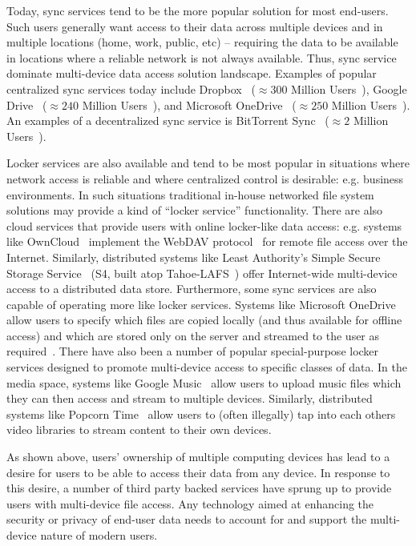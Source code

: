 Today, sync services tend to be the more popular solution for most
end-users. Such users generally want access to their data across
multiple devices and in multiple locations (home, work, public,
etc) -- requiring the data to be available in locations where a
reliable network is not always available. Thus, sync service dominate
multi-device data access solution landscape. Examples of popular
centralized sync services today include Dropbox~\cite{dropbox}
($\approx300$ Million Users~\cite{smith-stats}), Google
Drive~\cite{google-drive} ($\approx240$ Million
Users~\cite{smith-stats}), and Microsoft
OneDrive~\cite{microsoft-onedrive} ($\approx250$ Million
Users~\cite{smith-stats}).  An examples of a decentralized sync
service is BitTorrent Sync~\cite{bittorrent-sync} ($\approx2$ Million
Users~\cite{smith-stats}).

Locker services are also available and tend to be most popular in
situations where network access is reliable and where centralized
control is desirable: e.g. business environments. In such situations
traditional in-house networked file system solutions may provide a
kind of ``locker service'' functionality. There are also cloud
services that provide users with online locker-like data access:
e.g. systems like OwnCloud~\cite{owncloud} implement the WebDAV
protocol~\cite{goland1999} for remote file access over the
Internet. Similarly, distributed systems like Least Authority's Simple
Secure Storage Service~\cite{leastauthority-s4} (S4, built atop
Tahoe-LAFS~\cite{wilcox-o'hearn2008}) offer Internet-wide multi-device
access to a distributed data store. Furthermore, some sync services
are also capable of operating more like locker services. Systems like
Microsoft OneDrive allow users to specify which files are copied
locally (and thus available for offline access) and which are stored
only on the server and streamed to the user as
required~\cite{microsoft-onedrive-online}. There have also been a
number of popular special-purpose locker services designed to promote
multi-device access to specific classes of data. In the media space,
systems like Google Music~\cite{google-music} allow users to upload
music files which they can then access and stream to multiple
devices. Similarly, distributed systems like Popcorn
Time~\cite{popcorntime} allow users to (often illegally) tap into each
others video libraries to stream content to their own devices.

As shown above, users' ownership of multiple computing devices has
lead to a desire for users to be able to access their data from any
device. In response to this desire, a number of third party backed
services have sprung up to provide users with multi-device file
access. Any technology aimed at enhancing the security or privacy of
end-user data needs to account for and support the multi-device nature
of modern users.

